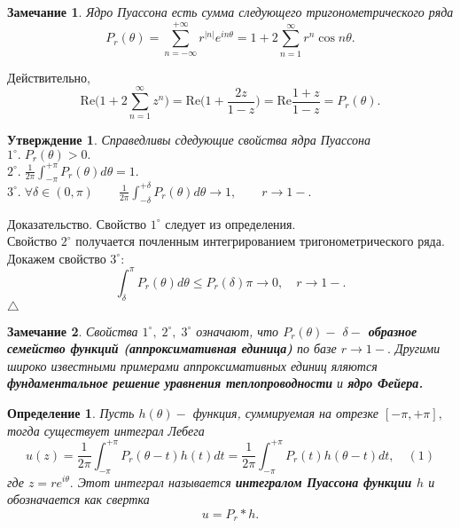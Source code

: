 \documentclass[12pt,a4paper]{article}
\theoremstyle{plain}   \newtheorem{Pro}{Задача}
\newtheorem{Sta}{Утверждение}
\newtheorem{Def}{Определение}
\newtheorem{Rem}{Замечание}
\begin{document}
\begin{Rem}
Ядро Пуассона есть сумма следующего тригонометрического ряда
$$
  P_r (\theta )=\sum _{n=-\infty}^{+\infty}
  r^{|n|}e^{in\theta}=1+2\sum_{n=1}^{\infty}
  r^n \cos n\theta .
$$
\end{Rem}
Действительно,
$$
  \mathrm{Re} \Biggl ( 1+2\sum_{n=1}^{\infty}z^n \Biggr ) =
  \mathrm{Re} \Biggl (1+\frac{2z}{1-z} \Biggr )=
  \mathrm{Re}\frac{1+z}{1-z}=P_r (\theta ).
$$
\begin{Sta}
Справедливы сдедующие свойства ядра Пуассона
\\
$ 1^{\circ}. \; P_r (\theta )>0. $
\\
$ 2^{\circ}. \; \frac{1}{2\pi}\int_{-\pi}^{+\pi}
P_r (\theta )d\theta =1. $
\\
$ 3^{\circ}. \; \forall \delta \in (0, \pi )
\qquad \frac{1}{2\pi}\int_{-\delta} ^{ +\delta}
P_r(\theta ) d\theta \longrightarrow 1,
\qquad r \rightarrow 1- . $
\end{Sta}
{\Large Доказательство.}
Свойство
$ 1^{\circ} $
следует из определения.
\\
Свойство
$ 2^{\circ} $
получается почленным интегрированием тригонометрического ряда.
\\
Докажем свойство
$ 3^{\circ}: $
$$
  \int_{\delta}^{\pi}P_r (\theta )d\theta
  \leq P_r (\delta ) \pi \rightarrow 0,
  \quad r \rightarrow 1-.
$$
$ \triangle $
\begin{Rem}
Свойства
$ 1^{\circ}, \; 2^{\circ}, \; 3^{\circ} $
означают, что
$ P_r (\theta ) - $
{\bfseries $ \delta - $ образное семейство функций
(аппроксимативная единица)}
по базе
$ r \rightarrow 1- . $
Другими широко известными примерами аппроксимативных единиц
яляются
{\bfseries фундаментальное решение уравнения теплопроводности}
и
{\bfseries ядро Фейера.}
\end{Rem}
\begin{Def}
Пусть
$ h(\theta )- $
функция, суммируемая на отрезке
$ [-\pi , +\pi ] , $
тогда существует интеграл Лебега
$$
  u(z)=\frac{1}{2\pi}\int _{-\pi}^{+\pi}
  P_r (\theta -t )h(t)dt =
  \frac{1}{2\pi} \int _{-\pi}^{+\pi}
  P_r (t)h(\theta -t ) dt , \quad (1)
$$
где
$ z=re^{i\theta} . $
Этот интеграл называется
{\bfseries интегралом Пуассона функции
$ h $ }
и обозначается как свертка
$$
  u=P_r \ast h .
$$
\end{Def}
\end{document}
